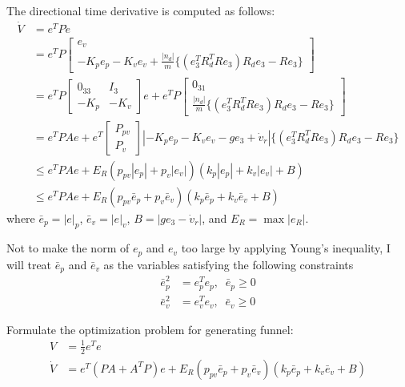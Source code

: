 \documentclass{article}
\begin{document}
The directional time derivative is computed as follows:
\begin{align}
\dot{V} &= e^TP\dot{e} \nonumber \\
&= e^TP\left[
\begin{array}{l}
e_v \\ -K_pe_p -K_ve_v + \frac{|n_d|}{m}\{(e_3^TR_d^TRe_3)R_de_3-Re_3\} 
\end{array}
\right] \nonumber \\
&= e^TP\left[
\begin{array}{cc}
0_{33} & I_3 \\ -K_p & -K_v
\end{array}
\right]e + 
e^TP\left[
\begin{array}{c}
0_{31} \\ \frac{|n_d|}{m}\{(e_3^TR_d^TRe_3)R_de_3-Re_3\} 
\end{array}
\right] \nonumber \\
&= e^TPAe + e^T
\left[
\begin{array}{c}
P_{pv} \\ P_v
\end{array}
\right]
|-K_p e_p -K_v e_v - ge_3 + \dot{v}_r|\{(e_3^TR_d^TRe_3)R_de_3-Re_3\} \nonumber \\
&\leq e^TPAe+ E_R(p_{pv}|e_p|+p_v|e_v|)(k_p|e_p|+k_v|e_v|+B) \nonumber  \\
&\leq e^TPAe+ E_R(p_{pv}\bar{e}_p+p_v\bar{e}_v)(k_p\bar{e}_p+k_v\bar{e}_v+B) \nonumber
\end{align}
where $\bar{e}_p = |e|_p$, $\bar{e}_v = |e|_v$, $B = |ge_3-\dot{v}_r|$, and $E_R = \max|e_R|$.

Not to make the norm of $e_p$ and $e_v$ too large by applying Young's inequality, I will treat $\bar{e}_p$ and $\bar{e}_v$ as the variables satisfying the following constraints
\begin{align}
\bar{e}_p^2 &= e_p^Te_p,\;\;\bar{e}_p \geq 0 \nonumber \\
\bar{e}_v^2 &= e_v^Te_v,\;\;\bar{e}_v \geq 0 \nonumber
\end{align}

Formulate the optimization problem for generating funnel:
\begin{align}
V &= \frac{1}{2}e^Te \nonumber \\
\dot{V} &= e^T(PA + A^TP)e+ E_R(p_{pv}\bar{e}_p+p_v\bar{e}_v)(k_p\bar{e}_p+k_v\bar{e}_v+B) \nonumber
\end{align}
\end{document}
